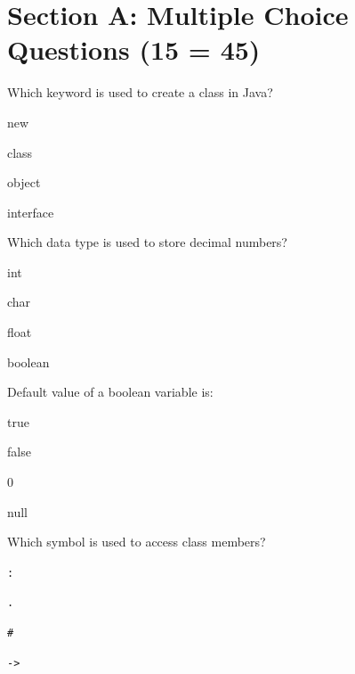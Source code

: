 \documentclass{USTBExam}
\begin{document}
\maketitle

\section{Section A: Multiple Choice Questions (15  = 45)}

\begin{question}
Which keyword is used to create a class in Java?
\paren
\begin{choices}
\item new
\item class
\item object
\item interface
\end{choices}
\end{question}

\begin{question}
Which data type is used to store decimal numbers?
\paren
\begin{choices}
\item int
\item char
\item float
\item boolean
\end{choices}
\end{question}

\begin{question}
Default value of a boolean variable is:
\paren
\begin{choices}
\item true
\item false
\item 0
\item null
\end{choices}
\end{question}

\begin{question}
Which symbol is used to access class members?
\paren
\begin{choices}
\item \texttt{:}
\item \texttt{.}
\item \texttt{\#} %
\item \texttt{->}
\end{choices}
\end{question}
\end{document}
